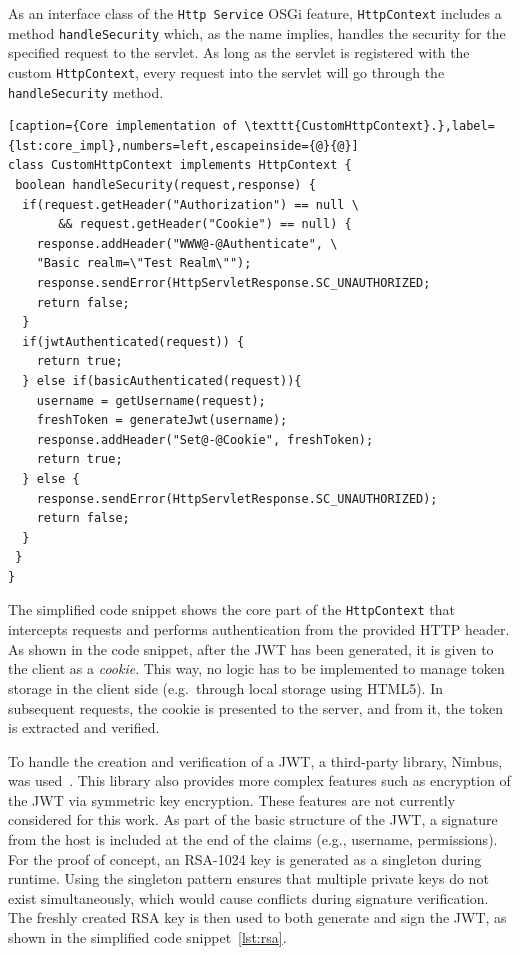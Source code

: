 \documentclass[12pt]{article}
\begin{document}
As an interface class of the \texttt{Http Service} OSGi feature, \texttt{HttpContext} includes a method \texttt{handleSecurity} which, as the name implies, handles the security for the specified request to the servlet. As long as the servlet is registered with the custom \texttt{HttpContext}, every request into the servlet will go through the \texttt{handleSecurity} method.

\begin{lstlisting}[caption={Core implementation of \texttt{CustomHttpContext}.},label={lst:core_impl},numbers=left,escapeinside={@}{@}]    
class CustomHttpContext implements HttpContext {   
 boolean handleSecurity(request,response) {
  if(request.getHeader("Authorization") == null \
       && request.getHeader("Cookie") == null) {
    response.addHeader("WWW@-@Authenticate", \
	"Basic realm=\"Test Realm\"");
    response.sendError(HttpServletResponse.SC_UNAUTHORIZED;
    return false;
  }	    
  if(jwtAuthenticated(request)) {
    return true;		
  } else if(basicAuthenticated(request)){
    username = getUsername(request);
    freshToken = generateJwt(username);
    response.addHeader("Set@-@Cookie", freshToken);
    return true;
  } else {
    response.sendError(HttpServletResponse.SC_UNAUTHORIZED);
    return false;
  }
 }
}
\end{lstlisting}

The simplified code snippet shows the core part of the \texttt{HttpContext} that intercepts requests and performs authentication from the provided HTTP header. As shown in the code snippet, after the JWT has been generated, it is given to the client as a \emph{cookie}. This way, no logic has to be implemented to manage token storage in the client side (e.g.\ through local storage using HTML5). In subsequent requests, the cookie is presented to the server, and from it, the token is extracted and verified.

To handle the creation and verification of a JWT, a third-party library, Nimbus, was used~\cite{nimbus}. This library also provides more complex features such as encryption of the JWT via symmetric key encryption. These features are not currently considered for this work. As part of the basic structure of the JWT, a signature from the host is included at the end of the claims (e.g., username, permissions). For the proof of concept, an RSA-1024 key is generated as a singleton during runtime. Using the singleton pattern ensures that multiple private keys do not exist simultaneously, which would cause conflicts during signature verification. The freshly created RSA key is then used to both generate and sign the JWT, as shown in the simplified code snippet~\ref{lst:rsa}.
\end{document}
